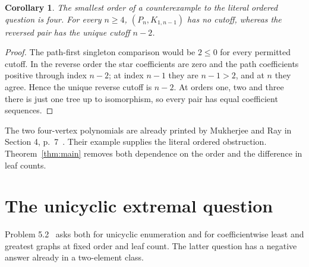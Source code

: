 \documentclass[11pt]{article}
\newtheorem{corollary}[theorem]{Corollary}
\begin{document}
\begin{corollary}\label{cor:small}
The smallest order of a counterexample to the literal ordered question
is four. For every $n\geq4$, $(P_n,K_{1,n-1})$ has no cutoff, whereas
the reversed pair has the unique cutoff $n-2$.
\end{corollary}
\begin{proof}
The path-first singleton comparison would be $2\leq0$ for every
permitted cutoff. In the reverse order the star coefficients are zero
and the path coefficients positive through index $n-2$; at index
$n-1$ they are $n-1>2$, and at $n$ they agree. Hence the unique
reverse cutoff is $n-2$. At orders one, two and three there is just
one tree up to isomorphism, so every pair has equal coefficient sequences.
\end{proof}
The two four-vertex polynomials are already printed by Mukherjee and
Ray in Section 4, p.~7~\cite{MR}. Their example supplies the literal
ordered obstruction. Theorem~\ref{thm:main} removes both dependence on
the order and the difference in leaf counts.

\section{The unicyclic extremal question}
Problem 5.2~\cite[p.~21]{MR} asks both for unicyclic enumeration and for
coefficientwise least and greatest graphs at fixed order and leaf count.
The latter question has a negative answer already in a two-element class.
\end{document}
